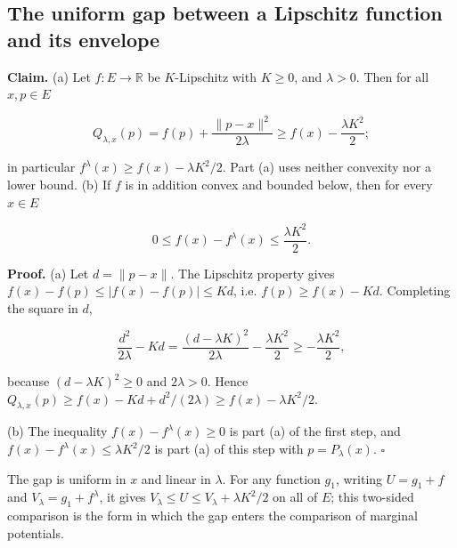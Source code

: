 \documentclass[11pt,a4paper]{report}
\begin{document}
\subsection{\texorpdfstring{The uniform gap between a Lipschitz function and its envelope}{The uniform gap between a Lipschitz function and its envelope}}
\label{report-step-ProximalLangevin-Moreau-lean-6}


\textbf{Claim.} (a) Let \(f:E\to\mathbb R\) be \(K\)-Lipschitz with \(K\ge0\), and \(\lambda>0\). Then for all \(x,p\in E\)


\[Q_{\lambda,x}(p)=f(p)+\frac{\|p-x\|^2}{2\lambda}\ge f(x)-\frac{\lambda K^2}{2};\]


in particular \(f^\lambda(x)\ge f(x)-\lambda K^2/2\). Part (a) uses neither convexity nor a lower bound. (b) If \(f\) is in addition convex and bounded below, then for every \(x\in E\)


\[0\le f(x)-f^\lambda(x)\le\frac{\lambda K^2}{2}.\]


\textbf{Proof.} (a) Let \(d=\|p-x\|\). The Lipschitz property gives \(f(x)-f(p)\le|f(x)-f(p)|\le Kd\), i.e. \(f(p)\ge f(x)-Kd\). Completing the square in \(d\),


\[\frac{d^2}{2\lambda}-Kd=\frac{(d-\lambda K)^2}{2\lambda}-\frac{\lambda K^2}{2}\ge-\frac{\lambda K^2}{2},\]


because \((d-\lambda K)^2\ge0\) and \(2\lambda>0\). Hence \(Q_{\lambda,x}(p)\ge f(x)-Kd+d^2/(2\lambda)\ge f(x)-\lambda K^2/2\).




(b) The inequality \(f(x)-f^\lambda(x)\ge0\) is part (a) of the first step, and \(f(x)-f^\lambda(x)\le\lambda K^2/2\) is part (a) of this step with \(p=P_\lambda(x)\). \(\square\)




The gap is uniform in \(x\) and linear in \(\lambda\). For any function \(g_1\), writing \(U=g_1+f\) and \(V_\lambda=g_1+f^\lambda\), it gives \(V_\lambda\le U\le V_\lambda+\lambda K^2/2\) on all of \(E\); this two-sided comparison is the form in which the gap enters the comparison of marginal potentials.
\end{document}
